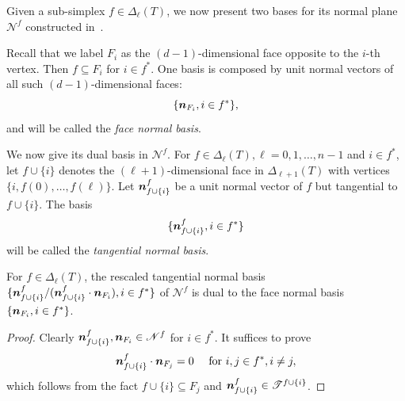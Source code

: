Given a sub-simplex $f\in \Delta_{\ell}(T)$, we now present two bases for its normal plane $\mathscr N^f$ constructed in~\cite{ChenChenHuangWei2023}. 

Recall that we label $F_i$ as the $(d-1)$-dimensional face opposite to the $i$-th vertex. Then $f\subseteq F_i$ for $i\in f^*$. One basis is composed by unit normal vectors of all such $(d-1)$-dimensional faces:
\begin{equation*}%
\{\bs n_{F_i}, i\in f^*\},
\end{equation*}
and will be called the {\it face normal basis}. 

We now give its dual basis in $\mathscr N^f$. 
For $f\in \Delta_{\ell}(T), \ell = 0,1,\ldots, n-1$ and $i\in f^*$, let $f\cup\{i\}$ denotes the $(\ell+1)$-dimensional face in $\Delta_{\ell+1}(T)$ with vertices $\{i, f(0),\dots, f(\ell)\}$. Let $\boldsymbol n_{f\cup\{i\}}^f$ be a unit normal vector of $f$ but tangential to $f\cup\{i\}$. The basis
\begin{equation*}%
\{\bs n_{f\cup\{i\}}^f, i\in f^*\}
\end{equation*}
will be called the {\it tangential normal basis}. 

\begin{lemma}\label{lem:normaldual}
For $f\in \Delta_{\ell}(T)$, the rescaled tangential normal basis $\{\boldsymbol n_{f\cup\{i\}}^f/(\boldsymbol n_{f\cup\{i\}}^f\cdot\boldsymbol n_{F_i}), i\in f^*\}$ of $\mathscr N^f$ is dual to the face normal basis $\{\boldsymbol n_{F_i}, i\in f^*\}$.
\end{lemma}
\begin{proof}
Clearly $\boldsymbol n_{f\cup\{i\}}^f, \boldsymbol n_{F_i}\in \mathscr N^f$ for $i\in f^*$. It suffices to prove
\begin{equation*}
 \boldsymbol n_{f\cup\{i\}}^f\cdot\boldsymbol n_{F_j}=0 \quad \textrm{ for } i,j\in f^*, i\neq j,
\end{equation*}
which follows from the fact $f\cup\{i\}\subseteq F_j$ and $\boldsymbol n_{f\cup\{i\}}^f\in\mathscr T^{f\cup\{i\}}$.
\end{proof}



